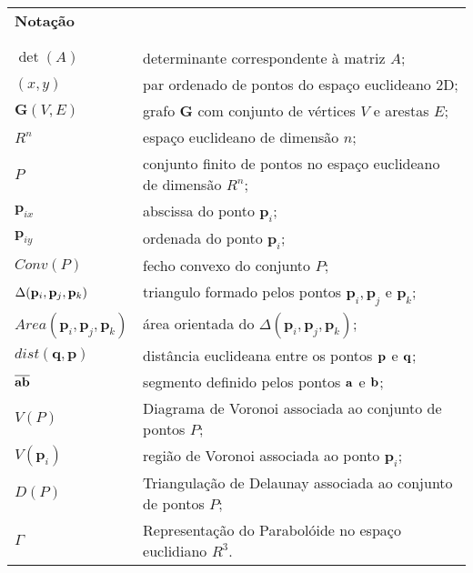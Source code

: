 
\begin{center}
\begin{tabular}{p{3.0cm}p{10.5cm}}
\multicolumn{2}{l}{\Large{\bf Nota\c{c}\~{a}o}} \\ \\ \\
$\det(A)$ & determinante correspondente \`{a} matriz $A$;\\
$(x,y)$ & par ordenado de pontos  do espa\c{c}o euclideano 2D; \\
${\mathbf G}(V, E)$ & grafo $\mathbf{G}$ com conjunto
de v\'{e}rtices $V$ e arestas $E$; \\ 
$R^{n}$ & espa\c{c}o euclideano de dimens\~{a}o $n$; \\
$P$ & conjunto finito de pontos no espa\c{c}o euclideano de
dimens\~{a}o $ R^n$;\\ 
${\mathbf {p}}_{ix}$ & abscissa do ponto ${\mathbf {p}}_i$; \\
${\mathbf {p}}_{iy}$ & ordenada do ponto ${\mathbf {p}}_i$; \\
$Conv(P)$ & fecho convexo do conjunto $P$; \\
$\Delta({\bf{p}}_{i},{\bf{p}}_{j},{\bf{p}}_{k})$ & triangulo formado pelos 
pontos ${\mathbf{p}}_{i},{\mathbf{p}}_{j}$ e ${\mathbf{p}}_{k}$; \\
$Area({\mathbf{p}}_{i},{\mathbf{p}}_{j},{\mathbf{p}}_{k})$ & \'{a}rea orientada 
do $\Delta({\mathbf{p}}_{i},{\mathbf{p}}_{j},{\mathbf{p}}_{k})$;\\
$\mathit{dist(\mathbf{q}, \mathbf{p})}$ & dist\^{a}ncia euclideana entre os pontos
${\bf p}$ e ${\bf q}$; \\ 
$\overline{{\bf ab}}$ & segmento definido pelos pontos ${\bf a}$ e
${\bf b}$;\\
${V}(P)$ & Diagrama de Voronoi associada ao conjunto de pontos $P$; \\ 
${V}({\mathbf{p}}_{i})$ & regi\~{a}o de Voronoi associada ao ponto ${\mathbf {p}}_{i}$; \\ 
${D}(P)$ & Triangula\c{c}\~{a}o de Delaunay associada ao conjunto de pontos $P$;\\
$\Gamma$ & Representa\c{c}\~{a}o do Parabol\'oide no espa\c{c}o euclidiano $R^3$.\\
\end{tabular}
\end{center}



